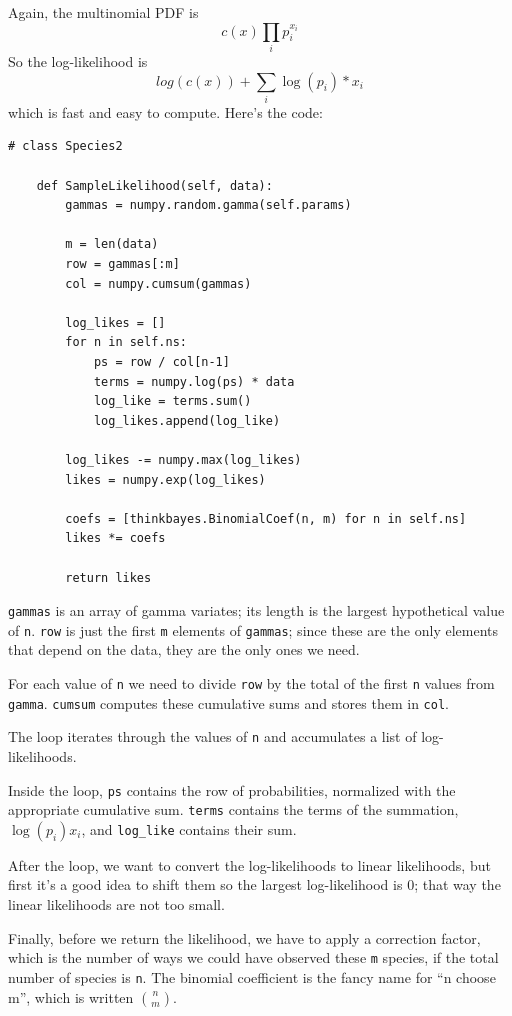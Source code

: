 \documentclass[12pt]{book}
\begin{document}
Again, the multinomial PDF is
%
\[ c(x) \prod_i p_i^{x_i}\]
%
So the log-likelihood is
%
\[ log(c(x)) + \sum_i \log(p_i) * x_i \]
%
which is fast and easy to compute.  Here's the code:

\begin{verbatim}
# class Species2

    def SampleLikelihood(self, data):
        gammas = numpy.random.gamma(self.params)

        m = len(data)
        row = gammas[:m]
        col = numpy.cumsum(gammas)

        log_likes = []
        for n in self.ns:
            ps = row / col[n-1]
            terms = numpy.log(ps) * data
            log_like = terms.sum()
            log_likes.append(log_like)

        log_likes -= numpy.max(log_likes)
        likes = numpy.exp(log_likes)

        coefs = [thinkbayes.BinomialCoef(n, m) for n in self.ns]
        likes *= coefs

        return likes
\end{verbatim}

{\tt gammas} is an array of gamma variates; its length is the largest
hypothetical value of {\tt n}.  {\tt row} is just the first {\tt m}
elements of {\tt gammas}; since these are the only elements that depend on
the data, they are the only ones we need.

For each value of {\tt n} we need to divide {\tt row} by the
total of the first {\tt n} values from {\tt gamma}.  {\tt cumsum}
computes these cumulative sums and stores them in {\tt col}.

The loop iterates through the values of {\tt n} and accumulates
a list of log-likelihoods.

Inside the loop, {\tt ps} contains the row of probabilities, normalized
with the appropriate cumulative sum.  {\tt terms} contains the
terms of the summation, $\log(p_i) x_i$, and \verb"log_like" contains
their sum.

After the loop, we want to convert the log-likelihoods to linear
likelihoods, but first it's a good idea to shift them so the largest
log-likelihood is 0; that way the linear likelihoods are not too
small.

Finally, before we return the likelihood, we have to apply a correction
factor, which is the number of ways we could have observed these {\tt m}
species, if the total number of species is {\tt n}.  The binomial
coefficient is the fancy name for ``n choose m'', which is written
$\binom{n}{m}$. 
\end{document}
